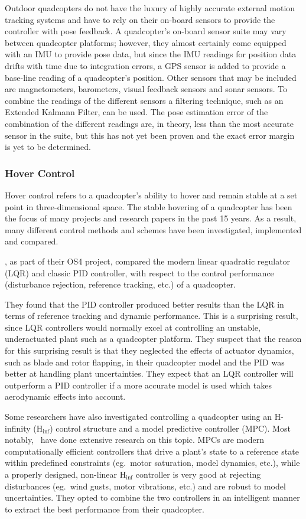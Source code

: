 Outdoor quadcopters do not have the luxury of highly accurate external motion tracking systems and have to rely on their on-board sensors to provide the controller with pose feedback. A quadcopter's on-board sensor suite may vary between quadcopter platforms; however, they almost certainly come equipped with an IMU to provide pose data, but since the IMU readings for position data drifts with time due to integration errors, a GPS sensor is added to provide a base-line reading of a quadcopter's position. Other sensors that may be included are magnetometers, barometers, visual feedback sensors and sonar sensors. To combine the readings of the different sensors a filtering technique, such as an Extended Kalmann Filter, can be used. The pose estimation error of the combination of the different readings are, in theory, less than the most accurate sensor in the suite, but this has not yet been proven and the exact error margin is yet to be determined. 

\subsubsection{Hover Control}

Hover control refers to a quadcopter's ability to hover and remain stable at a set point in three-dimensional space. The stable hovering of a quadcopter has been the focus of many projects and research papers in the past 15 years. As a result, many different control methods and schemes have been investigated, implemented and compared. 

\cite{bouabdallah2004pid}, as part of their OS4 project, compared the modern linear quadratic regulator (LQR) and classic PID controller, with respect to the control performance (disturbance rejection, reference tracking, etc.) of a quadcopter.

They found that the PID controller produced better results than the LQR in terms of reference tracking and dynamic performance. This is a surprising result, since LQR controllers would normally excel at controlling an unstable, underactuated plant such as a quadcopter platform. They suspect that the reason for this surprising result is that they neglected the effects of actuator dynamics, such as blade and rotor flapping, in their quadcopter model and the PID was better at handling plant uncertainties. They expect that an LQR controller will outperform a PID controller if a more accurate model is used which takes aerodynamic effects into account. 

Some researchers have also investigated controlling a quadcopter using an H-infinity (H$_{\inf}$) control structure and a model predictive controller (MPC). Most notably,~\cite{raffo2010integral} have done extensive research on this topic. MPCs are modern computationally efficient controllers that drive a plant's state to a reference state within predefined constraints (eg.\ motor saturation, model dynamics, etc.), while a properly designed, non-linear H$_{\inf}$ controller is very good at rejecting disturbances (eg.\ wind gusts, motor vibrations, etc.) and are robust to model uncertainties. They opted to combine the two controllers in an intelligent manner to extract the best performance from their quadcopter. 

